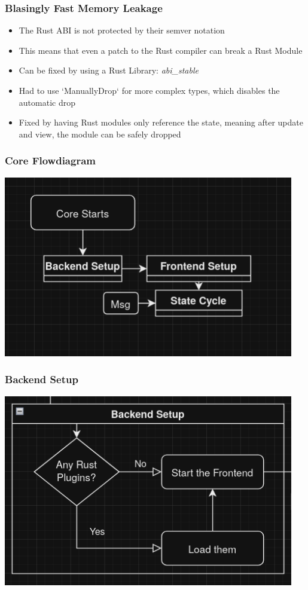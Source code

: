 \documentclass{beamer}
\begin{document}
\begin{frame}
  \frametitle{Blasingly Fast Memory Leakage }
  \begin{itemize}
    \item The Rust ABI is not protected by their semver notation
    \item This means that even a patch to the Rust compiler can break a
      Rust Module
    \item Can be fixed by using a Rust Library: \textit{abi\_stable}
    \item Had to use `ManuallyDrop` for more complex types, which disables
      the automatic drop
    \item Fixed by having Rust modules only reference the state, meaning
      after update and view, the module can be safely dropped
  \end{itemize}
\end{frame}

\hidelogo
\begin{frame}
  \frametitle{Core Flowdiagram}
  \centering
  \includegraphics[width=0.95\textwidth]{./pics/mini-core-cycle.png}
\end{frame}

\begin{frame}
  \frametitle{Backend Setup}
  \centering
  \includegraphics[width=0.95\textwidth]{./pics/backend-setup.png}
\end{frame}
\end{document}

